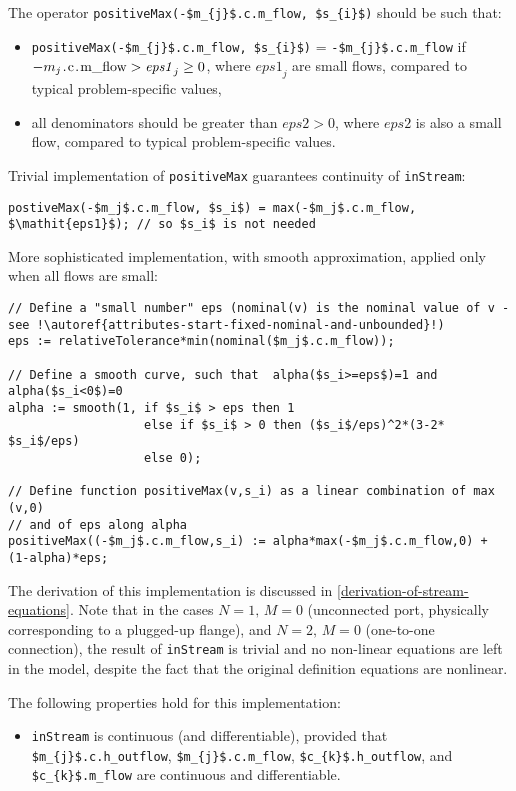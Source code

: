 \begin{nonnormative}
The operator
\lstinline[mathescape=true]!positiveMax(-$m_{j}$.c.m_flow, $s_{i}$)!
should be such that:
\begin{itemize}
\item
  \lstinline[mathescape=true]!positiveMax(-$m_{j}$.c.m_flow, $s_{i}$)! =
  \lstinline[mathescape=true]!-$m_{j}$.c.m_flow! if
  $-m_{j}\text{\lstinline!.c.m_flow!} > \mathit{eps1}_{j} \geq 0$,
  where $\mathit{eps1}_{j}$ are small flows, compared to typical
  problem-specific values,
\item
  all denominators should be greater than $\mathit{eps2} > 0$,
  where $\mathit{eps2}$ is also a small flow, compared to typical problem-specific
  values.
\end{itemize}

Trivial implementation of \lstinline!positiveMax! guarantees continuity of \lstinline!inStream!:
\begin{lstlisting}[language=modelica,mathescape=true]
postiveMax(-$m_j$.c.m_flow, $s_i$) = max(-$m_j$.c.m_flow, $\mathit{eps1}$); // so $s_i$ is not needed
\end{lstlisting}
More sophisticated implementation, with smooth approximation, applied only when {all} flows are small:
\begin{lstlisting}[language=modelica,escapechar=!,mathescape=true]
// Define a "small number" eps (nominal(v) is the nominal value of v - see !\autoref{attributes-start-fixed-nominal-and-unbounded}!)
eps := relativeTolerance*min(nominal($m_j$.c.m_flow));

// Define a smooth curve, such that  alpha($s_i>=eps$)=1 and alpha($s_i<0$)=0
alpha := smooth(1, if $s_i$ > eps then 1
                   else if $s_i$ > 0 then ($s_i$/eps)^2*(3-2* $s_i$/eps)
                   else 0);

// Define function positiveMax(v,s_i) as a linear combination of max (v,0)
// and of eps along alpha
positiveMax((-$m_j$.c.m_flow,s_i) := alpha*max(-$m_j$.c.m_flow,0) + (1-alpha)*eps;
\end{lstlisting}

The derivation of this implementation is discussed in
\autoref{derivation-of-stream-equations}. Note that in the cases $N = 1,\, M = 0$ (unconnected port,
physically corresponding to a plugged-up flange), and $N = 2,\,  M = 0$
(one-to-one connection), the result of \lstinline!inStream! is trivial
and no non-linear equations are left in the model, despite the fact that
the original definition equations are nonlinear.

The following properties hold for this implementation:
\begin{itemize}
\item
  \lstinline!inStream! is continuous (and differentiable),
  provided that \lstinline[mathescape=true]!$m_{j}$.c.h_outflow!,
  \lstinline[mathescape=true]!$m_{j}$.c.m_flow!, \lstinline[mathescape=true]!$c_{k}$.h_outflow!, and
  \lstinline[mathescape=true]!$c_{k}$.m_flow! are continuous and differentiable.
\end{itemize}


\end{nonnormative}
